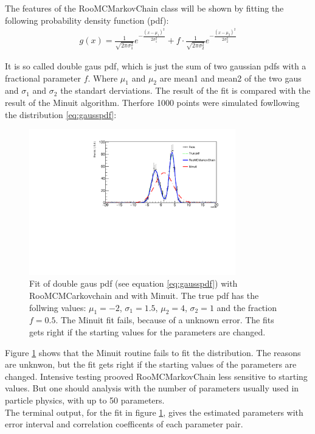\documentclass[english]{uzhpub}
\begin{document}
 The features of the RooMCMarkovChain class will be shown by fitting the following probability density function (pdf):
\begin{align}
  g(x) = \frac{1}{\sqrt{2 \pi \sigma_1^2}} e^{- \frac{(x-\mu_1)^2}{2 \sigma_1^2}} + f \cdot  \frac{1}{\sqrt{2 \pi \sigma_2^2}} e^{- \frac{(x-\mu_2)^2}{2 \sigma_2^2}} \label{eq:gausspdf}
 \end{align}


It is so called double gaus pdf, which is just the sum of two gaussian pdfs with a fractional parameter $f$. Where $\mu_1$ and $\mu_2$ are mean1 and mean2 of the two gaus and $\sigma_1$ and $\sigma_2$ the standart derviations.
The result of the fit is compared with the result of the Minuit algorithm. Therfore 1000 points were simulated fowllowing the distribution \ref{eq:gausspdf}:

\begin{figure}[H]
  \centering
  \includegraphics[width=0.8\textwidth]{RooMCMC/twogausfit}
  \caption{Fit of double gaus pdf (see equation \ref{eq:gausspdf}) with RooMCMCarkovchain and with Minuit. The true pdf has the follwing values: $\mu_1 = -2$, $\sigma_1 = 1.5$, $\mu_2 = 4$, $\sigma_2 = 1$ and the fraction $f = 0.5$. The Minuit fit fails, because of a unknown error. The fits gets right if the starting values for the parameters are changed.}
  \label{fig:twogaus}
\end{figure}
Figure \ref{fig:twogaus} shows that the Minuit routine fails to fit the distribution. The reasons are unknwon, but the fit gets right if the starting values of the parameters are changed. Intensive testing prooved RooMCMarkovChain less sensitive to starting values. But one should analysis with the number of parameters usually used in particle physics, with up to 50 parameters. \\
The terminal output, for the fit in figure \ref{fig:twogaus}, gives the estimated parameters with error interval and correlation coefficents of each parameter pair.
\end{document}
